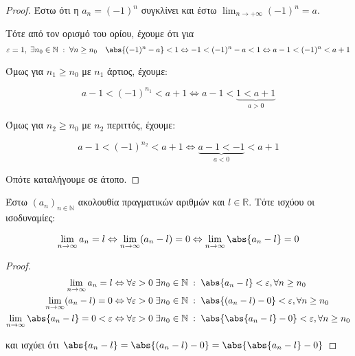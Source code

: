 \documentclass[main.tex]{subfiles}
\begin{document}
\begin{proof}
\item {}
    Έστω ότι η $ a_{n}= (-1)^{n} $ συγκλίνει και έστω $ \lim_{n \to +
    \infty}(-1)^{n} = a $. 
    
    Τότε από τον ορισμό του ορίου, έχουμε ότι για 
    \[ 
        \varepsilon = 1, \; \exists n_{0} \in \mathbb{N} \; : \; \forall 
    n \geq n_{0} \quad \abs{(-1)^{n}-a} < 1 \Leftrightarrow -1 < (-1)^{n}
    -a < 1 \Leftrightarrow a-1 < (-1)^{n} < a+1
\]

Όμως για $ n_{1} \geq n_{0} $ με $ n_{1} $ άρτιος, έχουμε:

\[
    a-1 <  (-1)^{n_{1}} < a+1 \Leftrightarrow a-1 < 
    \underbrace{1 < a+1}_{a>0} 
 \] 

Όμως για $ n_{2} \geq n_{0} $ με $ n_{2} $ περιττός, έχουμε:

\[
    a-1 <  (-1)^{n_{2}} < a+1 \Leftrightarrow 
    \underbrace{a-1 < -1}_{a<0} < a+1
 \] 

 Οπότε καταλήγουμε σε άτοπο.
\end{proof}


\begin{prop}
    Έστω $ (a_{n})_{n \in \mathbb{N}} $ ακολουθία πραγματικών αριθμών και 
    $ l \in \mathbb{R} $. Τότε ισχύου οι ισοδυναμίες:

    \[ \lim_{n \to \infty} a_{n} = l \Leftrightarrow \lim_{n \to \infty} (
        a_{n}- l) = 0 
    \Leftrightarrow \lim_{n \to \infty} \abs{a_{n}-l} = 0\]
\end{prop}

\begin{proof}
\item {}
    \begin{align*} \lim_{n \to \infty} a_{n}= l & \Leftrightarrow \forall 
        \varepsilon > 0 \; \exists n_{0} \in \mathbb{N} \; : \; 
        \abs{a_{n}-l} < \varepsilon, \forall n \geq n_{0} \\ 
    \lim_{n \to \infty} (a_{n}-l) = 0 & \Leftrightarrow \forall 
    \varepsilon >0 \; \exists n_{0} \in \mathbb{N} \; : \; 
    \abs {(a_{n}-l) - 0} < \varepsilon , \forall n \geq n_{0} \\
    \lim_{n \to \infty} \abs{a_{n}-l}=0 < \varepsilon & \Leftrightarrow 
    \forall \varepsilon > 0 \; \exists n_{0} \in \mathbb{N} 
    \; : \; \abs {\abs{a_{n}- l } - 0} < \varepsilon, \forall n \geq n_{0} 
\end{align*}

και ισχύει ότι $ \abs{a_{n}-l} = \abs{(a_{n}-l)-0} = 
\abs{\abs{a_{n}- l} -0} $
\end{proof}
\end{document}
